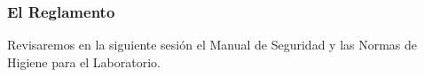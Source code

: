 \documentclass[14pt]{beamer}
\begin{document}
\begin{frame}
\frametitle{El Reglamento}
Revisaremos en la siguiente sesión el Manual de Seguridad y las Normas de Higiene para el Laboratorio.
\end{frame}


\end{document}
